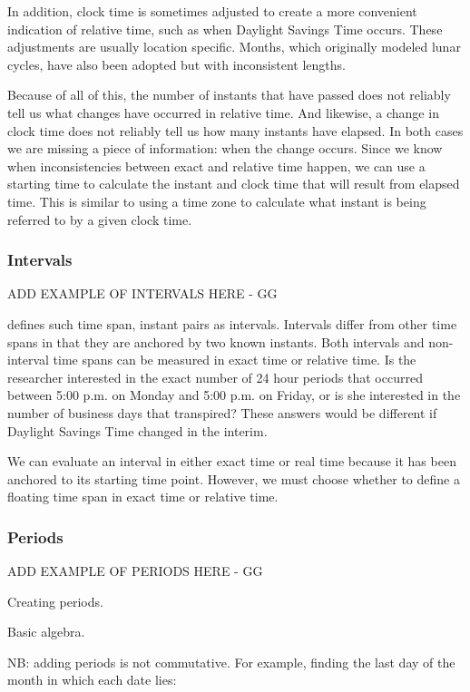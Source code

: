 \documentclass[article]{jss}
\begin{document}
In addition, clock time is sometimes adjusted to create a more convenient indication of relative time, such as when Daylight Savings Time occurs.  These adjustments are usually location specific. Months, which originally modeled lunar cycles, have also been adopted but with inconsistent lengths.

Because of all of this, the number of instants that have passed does not reliably tell us what changes have occurred in relative time. And likewise, a change in clock time does not reliably tell us how many instants have elapsed. In both cases we are missing a piece of information: when the change occurs. Since we know when inconsistencies between exact and relative time happen, we can use a starting time to calculate the instant and clock time that will result from elapsed time. This is similar to using a time zone to calculate what instant is being referred to by a given clock time.

\subsubsection{Intervals}

ADD EXAMPLE OF INTERVALS HERE - GG

 defines such time span, instant pairs as intervals. Intervals differ from other time spans in that they are anchored by two known instants. Both intervals and non-interval time spans can be measured in exact time or relative time. Is the researcher interested in the exact number of 24 hour periods that occurred between 5:00 p.m. on Monday and 5:00 p.m. on Friday, or is she interested in the number of business days that transpired? These answers would be different if Daylight Savings Time changed in the interim.

We can evaluate an interval in either exact time or real time because it has been anchored to its starting time point. However, we must choose whether to define a floating time span in exact time or relative time.



\subsubsection{Periods}
\label{sec:periods}

ADD EXAMPLE OF PERIODS HERE - GG

Creating periods.  

Basic algebra.

NB: adding periods is not commutative. For example, finding the last day of the month in which each date lies:
\end{document}
